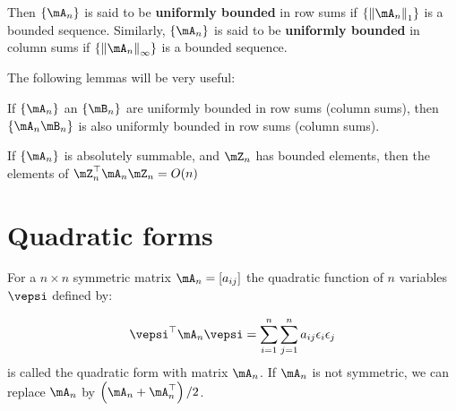 \documentclass[english,12pt]{book}\usepackage[]{graphicx}\usepackage[]{xcolor}
\begin{document}
Then $\left\lbrace \mA_n \right\rbrace$ is said to be \textbf{uniformly bounded} in row sums if $\left\lbrace\left\|\mA_n\right\|_1\right\rbrace$ is a bounded sequence. Similarly, $\left\lbrace \mA_n \right\rbrace$ is said to be \textbf{uniformly bounded} in column sums if $\left\lbrace\left\|\mA_n\right\|_{\infty}\right\rbrace$ is a bounded sequence. 

The following lemmas will be very useful:

\begin{lemma}\label{lemma:bounded_lemma}
If $\left\lbrace \mA_n \right\rbrace$ an $\left\lbrace \mB_n \right\rbrace$ are uniformly bounded in row sums (column sums), then $\left\lbrace \mA_n \mB_n\right\rbrace$ is also uniformly bounded in row sums (column sums).
\end{lemma}

\begin{lemma}\label{lemma:bounde_ON}
If $\left\lbrace \mA_n \right\rbrace$ is absolutely summable, and $\mZ_n$ has bounded elements, then the elements of $\mZ_n^\top \mA_n\mZ_n = O(n)$
\end{lemma}


\section{Quadratic forms}

\begin{definition}\label{def:quad-form}
For a $n\times n$ symmetric matrix $\mA_n=\left[a_{ij}\right]$ the quadratic function of $n$ variables $\vepsi$ defined by:

\begin{equation}
\vepsi^\top \mA_n \vepsi = \sum_{i = 1}^n\sum_{j = 1}^na_{ij}\epsilon_i\epsilon_j
\end{equation}
%
is called the quadratic form with matrix $\mA_n$.  If $\mA_n$ is not symmetric, we can replace $\mA_n$ by $\left(\mA_n + \mA_n^\top\right)/2$.
\end{definition}
\end{document}

